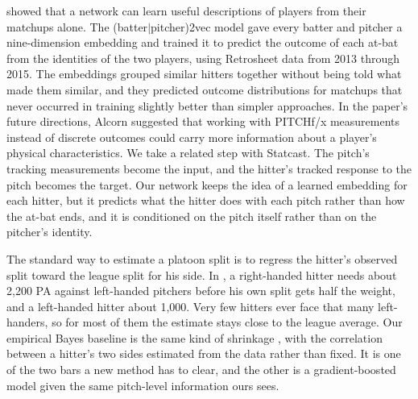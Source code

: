 \documentclass[11pt,letterpaper]{article}
\begin{document}
\citet{alcorn2018} showed that a network can learn useful descriptions of players from their matchups alone. The (batter$|$pitcher)2vec model gave every batter and pitcher a nine-dimension embedding and trained it to predict the outcome of each at-bat from the identities of the two players, using Retrosheet data from 2013 through 2015. The embeddings grouped similar hitters together without being told what made them similar, and they predicted outcome distributions for matchups that never occurred in training slightly better than simpler approaches. In the paper's future directions, Alcorn suggested that working with PITCHf/x measurements instead of discrete outcomes could carry more information about a player's physical characteristics. We take a related step with Statcast. The pitch's tracking measurements become the input, and the hitter's tracked response to the pitch becomes the target. Our network keeps the idea of a learned embedding for each hitter, but it predicts what the hitter does with each pitch rather than how the at-bat ends, and it is conditioned on the pitch itself rather than on the pitcher's identity.

The standard way to estimate a platoon split is to regress the hitter's observed split toward the league split for his side. In \citet[p.~157]{tango2007}, a right-handed hitter needs about 2,200 PA against left-handed pitchers before his own split gets half the weight, and a left-handed hitter about 1,000. Very few hitters ever face that many left-handers, so for most of them the estimate stays close to the league average. Our empirical Bayes baseline is the same kind of shrinkage \citep{efron1972}, with the correlation between a hitter's two sides estimated from the data rather than fixed. It is one of the two bars a new method has to clear, and the other is a gradient-boosted model given the same pitch-level information ours sees.
\end{document}
